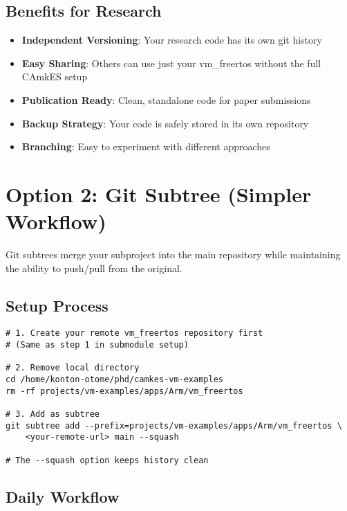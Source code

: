 \documentclass[11pt,a4paper]{article}
\begin{document}
\subsection{Benefits for Research}

\begin{itemize}
\item \textbf{Independent Versioning}: Your research code has its own git history
\item \textbf{Easy Sharing}: Others can use just your vm\_freertos without the full CAmkES setup
\item \textbf{Publication Ready}: Clean, standalone code for paper submissions
\item \textbf{Backup Strategy}: Your code is safely stored in its own repository
\item \textbf{Branching}: Easy to experiment with different approaches
\end{itemize}

\section{Option 2: Git Subtree (Simpler Workflow)}

Git subtrees merge your subproject into the main repository while maintaining the ability to push/pull from the original.

\subsection{Setup Process}

\begin{lstlisting}[caption=Setting Up Git Subtree]
# 1. Create your remote vm_freertos repository first
# (Same as step 1 in submodule setup)

# 2. Remove local directory
cd /home/konton-otome/phd/camkes-vm-examples
rm -rf projects/vm-examples/apps/Arm/vm_freertos

# 3. Add as subtree
git subtree add --prefix=projects/vm-examples/apps/Arm/vm_freertos \
    <your-remote-url> main --squash

# The --squash option keeps history clean
\end{lstlisting}

\subsection{Daily Workflow}
\end{document}
